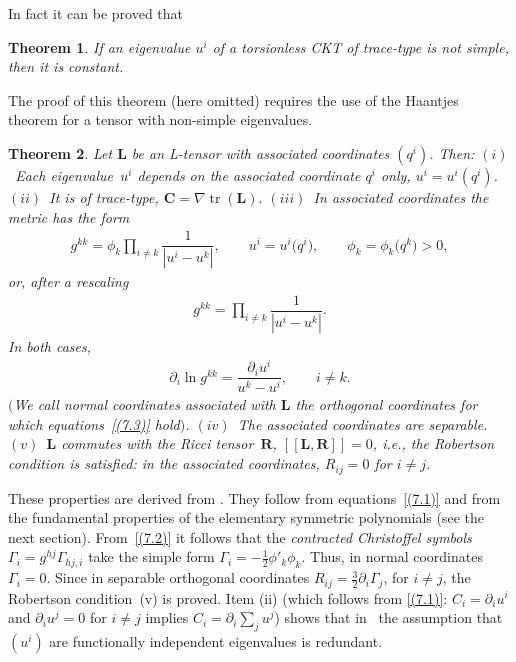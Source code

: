 \documentclass[pdftex]{sigma}
\def\bs{\boldsymbol}
\numberwithin{equation}{section}
\newtheorem{Theorem}{Theorem}[section]
 { \theoremstyle{definition}
\newtheorem{Notation}[Theorem]{Notation}
\newtheorem{Example}[Theorem]{Example}
\newtheorem{Remark}[Theorem]{Remark}
\newtheorem{Remarks}[Theorem]{Remarks}
 }
\begin{document}
In fact it can be proved that

\begin{Theorem}\label{t:7.1}
If an eigenvalue $u^i$ of a torsionless CKT of trace-type is not simple, then it is constant.
\end{Theorem}

The proof of this theorem (here omitted) requires the use of the Haantjes theorem for a tensor with non-simple eigenvalues.

\begin{Theorem}\label{t:7.2}\sloppy
Let $\bs L$ be an L-tensor with associated coordinates $(q^i)$. Then:
$(i)$~Each eigenva\-lue~$u^i$ depends on the associated coordinate $q^i$ only, $u^i=u^i(q^i)$.
$(ii)$~It is of trace-type, $\bs C=\nabla\operatorname{tr}(\bs L).$
$(iii)$~In associated coordinates the metric has the form
\begin{gather}
g^{kk}=\phi_k \prod_{i\neq k}\dfrac 1{|u^i-u^k|}, \qquad u^i=u^i\big(q^i\big), \qquad\phi_k=\phi_k\big(q^k\big)>0,
\label{(7.2)}
\end{gather}
or, after a rescaling
\begin{gather}
g^{kk}=\prod_{i\neq k}\dfrac 1{|u^i-u^k|}.
\label{(7.3)}
\end{gather}
In both cases,
\begin{gather*}
\partial_i\ln g^{kk}=\dfrac {\partial_i u^i}{u^k-u^i},\qquad  i\neq k.
\end{gather*}
$($We call  normal coordinates associated with $\bs L$ the orthogonal coordinates for which equa\-tions~\eqref{(7.3)} hold$)$. $(iv)$~The associated coordinates are separable.
$(v)$~$\bs L$ commutes with the Ricci ten\-sor~$\bs R$, $[\! [\bs L,\bs R]\! ]=0$, i.e.,  the Robertson condition is satisfied: in the associated coordinates, $R_{ij}=0$ for $i\neq j$.
\end{Theorem}

These properties are derived from \cite{Benenti-1992b,Benenti-1993}. They follow from equations~\eqref{(7.1)} and from the fundamental properties of the elementary symmetric polynomials (see the next section).
From~\eqref{(7.2)} it follows that the {\it contracted Christoffel symbols} $\Gamma_i=g^{hj}\Gamma_{hj,i}$ take the simple form
$\Gamma_i=-\tfrac 12 \phi'_k\phi_k$. Thus, in normal coordinates $\Gamma_i=0$. Since in separable orthogonal coordinates
$R_{ij}=\tfrac 32 \partial_i\Gamma_j$, for $i\neq j$, the Robertson condition~(v) is proved. Item (ii) (which follows from \eqref{(7.1)}: $C_i=\partial_iu^i$ and $\partial_iu^j=0$ for $i\neq j$ implies $C_i=\partial_i\sum_ju^j$) shows that in~\cite[Proposition~1, Section~1]{Crampin-2003a} the assumption that~$(u^i)$ are functionally independent eigenvalues is redundant.
\end{document}
